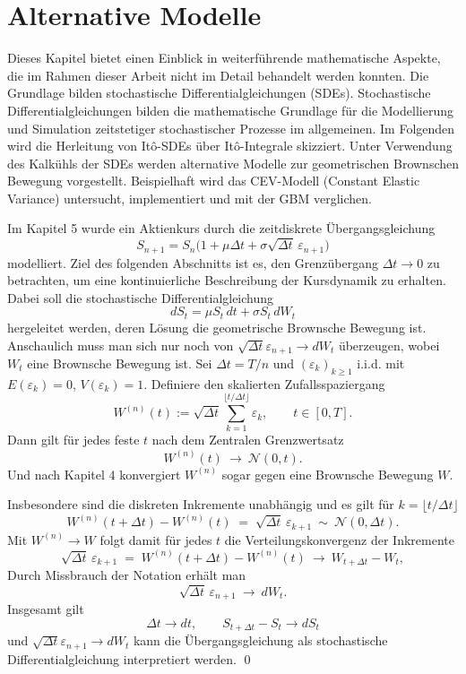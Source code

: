 \section{Alternative Modelle}

Dieses Kapitel bietet einen Einblick in weiterführende mathematische Aspekte, die im Rahmen dieser Arbeit nicht im Detail behandelt werden konnten.
Die Grundlage bilden stochastische Differentialgleichungen (SDEs).  
Stochastische Differentialgleichungen bilden die mathematische Grundlage für die Modellierung und Simulation zeitstetiger stochastischer Prozesse im allgemeinen.
Im Folgenden wird die Herleitung von It\^o-SDEs über It\^o-Integrale skizziert. 
Unter Verwendung des Kalkühls der SDEs werden alternative Modelle zur geometrischen Brownschen Bewegung vorgestellt. 
Beispielhaft wird das CEV-Modell (Constant Elastic Variance) untersucht, implementiert
und mit der GBM verglichen.

\begin{bem}

Im Kapitel 5 wurde ein Aktienkurs durch die zeitdiskrete Übergangsgleichung
$$S_{n+1} = S_n \big(1 + \mu \Delta t + \sigma \sqrt{\Delta t}\,\varepsilon_{n+1}\big)$$
modelliert. Ziel des folgenden Abschnitts ist es, den Grenzübergang $\Delta t \to 0$ zu betrachten,
um eine kontinuierliche Beschreibung der Kursdynamik zu erhalten. Dabei soll die stochastische Differentialgleichung
$$dS_t = \mu S_t\,dt + \sigma S_t\,dW_t$$
hergeleitet werden, deren Lösung die geometrische Brownsche Bewegung ist. 
Anschaulich muss man sich nur noch von $\sqrt{\Delta t} \varepsilon_{n+1} \to dW_t$ überzeugen, wobei $W_t$ eine Brownsche Bewegung ist.
Sei $\Delta t = T/n$ und $(\varepsilon_k)_{k\ge 1}$ i.i.d. mit $E(\varepsilon_k)=0$, $V(\varepsilon_k)=1$.
Definiere den skalierten Zufallsspaziergang
$$
W^{(n)}(t) := \sqrt{\Delta t}\sum_{k=1}^{\lfloor t/\Delta t\rfloor}\varepsilon_k,\qquad t\in[0,T].
$$
Dann gilt für jedes feste $t$ nach dem Zentralen Grenzwertsatz
$$
W^{(n)}(t)\ \to\ \mathcal N(0,t).
$$
Und nach Kapitel 4 konvergiert $W^{(n)}$ sogar gegen eine Brownsche Bewegung $W$.

Insbesondere sind die diskreten Inkremente unabhängig und es gilt für $k=\lfloor t/\Delta t\rfloor$
$$
W^{(n)}(t+\Delta t)-W^{(n)}(t)\;=\;\sqrt{\Delta t}\,\varepsilon_{k+1}\ \sim\ \mathcal N(0,\Delta t).
$$
Mit $W^{(n)}\to W$ folgt damit für jedes $t$ die Verteilungskonvergenz der Inkremente
$$
\sqrt{\Delta t}\,\varepsilon_{k+1}
\;=\;W^{(n)}(t+\Delta t)-W^{(n)}(t)\ \to \ W_{t+\Delta t}-W_t,
$$
Durch Missbrauch der Notation erhält man
$$
\sqrt{\Delta t}\,\varepsilon_{n+1}\ \to\ dW_t.
$$
Insgesamt gilt
$$\Delta t \to dt, \qquad S_{t + \Delta t} - S_t \to dS_t$$
und $\sqrt{\Delta t} \varepsilon_{n+1} \to dW_t$
kann die Übergangsgleichung als stochastische Differentialgleichung interpretiert werden.
\qed

\end{bem}

